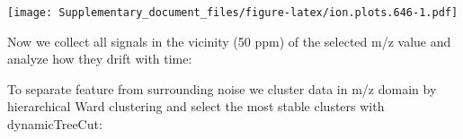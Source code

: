 \documentclass[]{article}
\newenvironment{Shaded}{\begin{snugshade}}{\end{snugshade}}
\newcommand{\KeywordTok}[1]{\textcolor[rgb]{0.13,0.29,0.53}{\textbf{#1}}}
\newcommand{\FloatTok}[1]{\textcolor[rgb]{0.00,0.00,0.81}{#1}}
\newcommand{\StringTok}[1]{\textcolor[rgb]{0.31,0.60,0.02}{#1}}
\newcommand{\OperatorTok}[1]{\textcolor[rgb]{0.81,0.36,0.00}{\textbf{#1}}}
\newcommand{\NormalTok}[1]{#1}
\begin{document}
\texttt{[image: Supplementary\_document\_files/figure-latex/ion.plots.646-1.pdf]}

Now we collect all signals in the vicinity (50 ppm) of the selected m/z
value and analyze how they drift with time:

\begin{Shaded}
\end{Shaded}

To separate feature from surrounding noise we cluster data in m/z domain
by hierarchical Ward clustering and select the most stable clusters with
dynamicTreeCut:
\end{document}
